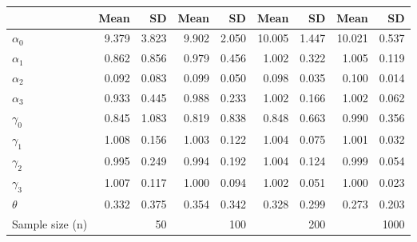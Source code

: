 
\begin{tabular}[t]{lrrrrrrrr}
\toprule
  & Mean & SD & Mean  & SD  & Mean   & SD   & Mean    & SD   \\
\midrule
$\alpha_{0}$ & 9.379 & 3.823 & 9.902 & 2.050 & 10.005 & 1.447 & 10.021 & 0.537\\
$\alpha_{1}$ & 0.862 & 0.856 & 0.979 & 0.456 & 1.002 & 0.322 & 1.005 & 0.119\\
$\alpha_{2}$ & 0.092 & 0.083 & 0.099 & 0.050 & 0.098 & 0.035 & 0.100 & 0.014\\
$\alpha_{3}$ & 0.933 & 0.445 & 0.988 & 0.233 & 1.002 & 0.166 & 1.002 & 0.062\\
$\gamma_{0}$ & 0.845 & 1.083 & 0.819 & 0.838 & 0.848 & 0.663 & 0.990 & 0.356\\
$\gamma_{1}$ & 1.008 & 0.156 & 1.003 & 0.122 & 1.004 & 0.075 & 1.001 & 0.032\\
$\gamma_{2}$ & 0.995 & 0.249 & 0.994 & 0.192 & 1.004 & 0.124 & 0.999 & 0.054\\
$\gamma_{3}$ & 1.007 & 0.117 & 1.000 & 0.094 & 1.002 & 0.051 & 1.000 & 0.023\\
$\theta$ & 0.332 & 0.375 & 0.354 & 0.342 & 0.328 & 0.299 & 0.273 & 0.203\\
Sample size (n) &  & 50 &  & 100 &  & 200 &  & 1000\\
\bottomrule
\end{tabular}
